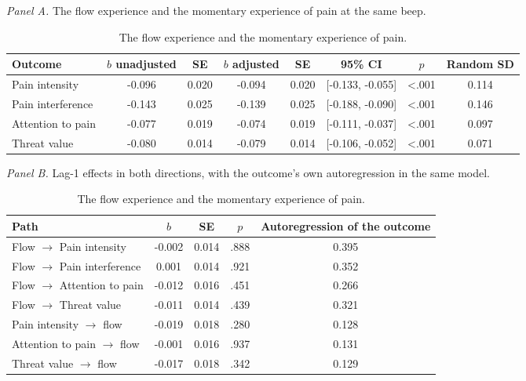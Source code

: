 \begin{table}[!htbp]
\raggedright
\caption{The flow experience and the momentary experience of pain.}
\label{tab:flowpain}
\footnotesize
\begingroup
\setlength{\tabcolsep}{4pt}
\renewcommand{\arraystretch}{1.08}
\noindent\textit{Panel A.} The flow experience and the momentary experience of pain at the same beep.\par\vspace{2pt}
\begin{tabular*}{\textwidth}{@{\extracolsep{\fill}}lccccccc@{}}
\toprule
Outcome & $b$ unadjusted & SE & $b$ adjusted & SE  & 95\% CI & $p$ & Random SD \\
\midrule
Pain intensity & -0.096 & 0.020 & -0.094 & 0.020 & [-0.133, -0.055] & <.001 & 0.114 \\
Pain interference & -0.143 & 0.025 & -0.139 & 0.025 & [-0.188, -0.090] & <.001 & 0.146 \\
Attention to pain & -0.077 & 0.019 & -0.074 & 0.019 & [-0.111, -0.037] & <.001 & 0.097 \\
Threat value & -0.080 & 0.014 & -0.079 & 0.014 & [-0.106, -0.052] & <.001 & 0.071 \\
\bottomrule
\end{tabular*}
\par\vspace{6pt}\noindent\textit{Panel B.} Lag-1 effects in both directions, with the outcome's own autoregression in the same model.\par\vspace{2pt}
\begin{tabular*}{\textwidth}{@{\extracolsep{\fill}}lcccc@{}}
\toprule
Path & $b$ & SE & $p$ & Autoregression of the outcome \\
\midrule
Flow $\rightarrow$ Pain intensity & -0.002 & 0.014 & .888 & 0.395 \\
Flow $\rightarrow$ Pain interference & 0.001 & 0.014 & .921 & 0.352 \\
Flow $\rightarrow$ Attention to pain & -0.012 & 0.016 & .451 & 0.266 \\
Flow $\rightarrow$ Threat value & -0.011 & 0.014 & .439 & 0.321 \\
Pain intensity $\rightarrow$ flow & -0.019 & 0.018 & .280 & 0.128 \\
Attention to pain $\rightarrow$ flow & -0.001 & 0.016 & .937 & 0.131 \\
Threat value $\rightarrow$ flow & -0.017 & 0.018 & .342 & 0.129 \\
\bottomrule
\end{tabular*}

\end{table}
